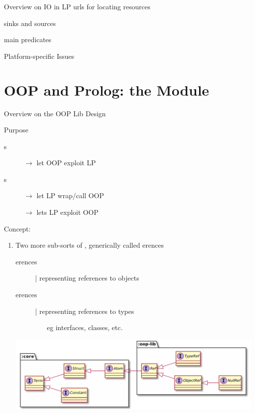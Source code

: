 \documentclass[handout]{beamer}
\begin{document}
\begin{frame}[allowframebreaks]{Overview on IO in LP}
    urls for locating resources

    sinks and sources

    main predicates
\end{frame}

\begin{frame}[allowframebreaks]{Platform-specific Issues}

\end{frame}

\section{OOP and Prolog: the  Module}

\begin{frame}[allowframebreaks]{Overview on the OOP Lib Design}

    \begin{block}{Purpose}
        \begin{description}
            \item[s] $\rightarrow$ let OOP exploit LP
            \item[s] $\rightarrow$ let LP wrap/call OOP 
            \item[] $\rightarrow$ lets LP exploit OOP 
        \end{description}
    \end{block}

    \framebreak

    Concept:
    \bigskip
    \begin{enumerate}
        \item Two more sub-sorts of , generically called \alert{erences}
        \begin{description}
            \item[erences] | representing references to \alert{objects}
            \item[erences] | representing references to \alert{type}s
            \begin{itemize}
                \item[eg] interfaces, classes, etc.
            \end{itemize} 
        \end{description}
        \begin{center}
            \includegraphics[width=\linewidth]{img/refs.pdf}
        \end{center}


\end{enumerate}
\end{frame}
\end{document}
